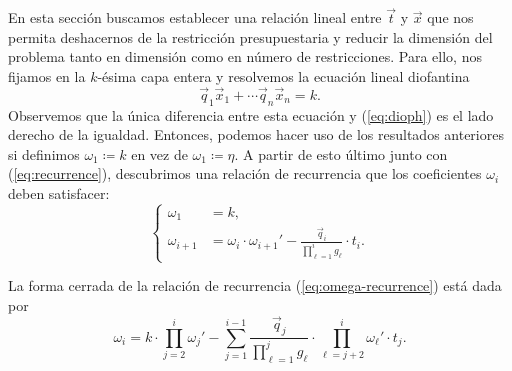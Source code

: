 En esta sección buscamos establecer una relación lineal entre $\vec{t}$ y $\vec{x}$ que nos permita
deshacernos de la restricción presupuestaria y reducir la dimensión del problema tanto en dimensión
como en número de restricciones. Para ello, nos fijamos en la $k$-ésima capa entera y resolvemos 
la ecuación lineal diofantina
\begin{equation*}
	\vec{q}_1\vec{x}_1 + \cdots \vec{q}_n\vec{x}_n = k.
\end{equation*}
Observemos que la única diferencia entre esta ecuación y (\ref{eq:dioph}) es el lado derecho de la
igualdad. Entonces, podemos hacer uso de los resultados anteriores si definimos $\omega_1 \coloneq
k$ en vez de $\omega_1 \coloneq \eta$. A partir de esto último junto con (\ref{eq:recurrence}),
descubrimos una relación de recurrencia que los coeficientes $\omega_i$ deben satisfacer:
\begin{equation}
	\label{eq:omega-recurrence}
	\begin{cases}
		\omega_1 &= k, \\
		\omega_{i + 1} &= \omega_i \cdot \omega_{i + 1}' - \frac{\vec{q}_i}{\prod_{\ell=1}^{i}g_\ell} \cdot t_i.
	\end{cases}
\end{equation}
\begin{lemma}
	La forma cerrada de la relación de recurrencia (\ref{eq:omega-recurrence}) está dada por
	\begin{equation}
		\label{eq:omega-formula}
		\omega_i =
		k \cdot \prod_{j=2}^{i} \omega_j'
		- \sum_{j=1}^{i - 1}\frac{\vec{q}_j}{\prod_{\ell=1}^{j}g_\ell}
		\cdot \prod_{\ell=j+2}^{i}\omega_\ell' \cdot t_j.
	\end{equation}
\end{lemma}
